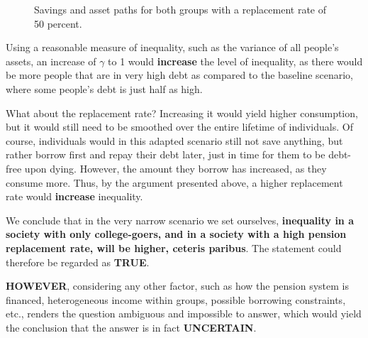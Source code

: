 \documentclass[a4paper, 12pt]{article}
\begin{document}
\begin{figure}[H]
    \centering
    \caption{Savings and asset paths for both groups with a replacement rate of 50 percent.}
    \label{fig:graph3a_4}
\end{figure}

Using a reasonable measure of inequality, such as the variance of all people's assets, an increase of $\gamma$ to 1 would \textbf{increase} the level of inequality, as there would be more people that are in very high debt as compared to the baseline scenario, where some people's debt is just half as high.

What about the replacement rate? Increasing it would yield higher consumption, but it would still need to be smoothed over the entire lifetime of individuals. Of course, individuals would in this adapted scenario still not save anything, but rather borrow first and repay their debt later, just in time for them to be debt-free upon dying. However, the amount they borrow has increased, as they consume more. Thus, by the argument presented above, a higher replacement rate would \textbf{increase} inequality.

We conclude that in the very narrow scenario we set ourselves, \textbf{inequality in a society with only college-goers, and in a society with a high pension replacement rate, will be higher, ceteris paribus}. The statement could therefore be regarded as \textbf{TRUE}.

\textbf{HOWEVER}, considering any other factor, such as how the pension system is financed, heterogeneous income within groups, possible borrowing constraints, etc., renders the question ambiguous and impossible to answer, which would yield the conclusion that the answer is in fact \textbf{UNCERTAIN}.
\end{document}
